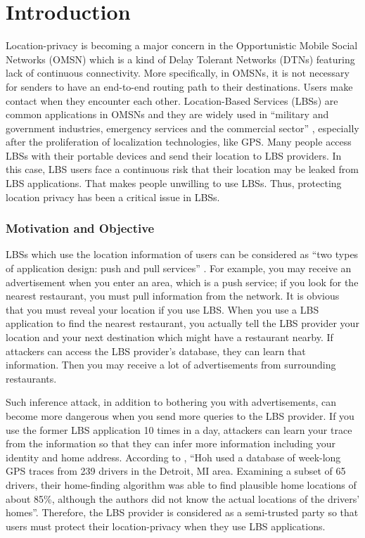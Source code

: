 \chapter {Introduction}
\label{INTRO}
\noindent Location-privacy is becoming a major concern in the Opportunistic Mobile Social Networks (OMSN) which is a kind of Delay Tolerant Networks (DTNs) \cite {C1} featuring lack of continuous connectivity. More specifically, in OMSNs, it is not necessary for senders to have an end-to-end routing path to their destinations. Users make contact when they encounter each other. Location-Based Services (LBSs) are common applications in OMSNs and they are widely used in ``military and government industries, emergency services and the commercial sector'' \cite {C4}, especially after the proliferation of localization technologies, like GPS. Many people access LBSs with their portable devices and send their location to LBS providers. In this case, LBS users face a continuous risk that their location may be leaked from LBS applications. That makes people unwilling to use LBSs. Thus, protecting location privacy has been a critical issue in LBSs.


\subsection{ Motivation and Objective}

\noindent LBSs which use the location information of users can be considered as ``two types of application design: push and pull services'' \cite {C4}. For example, you may receive an advertisement when you enter an area, which is a push service; if you look for the nearest restaurant, you must pull information from the network. It is obvious that you must reveal your location if you use LBS. When you use a LBS application to find the nearest restaurant, you actually tell the LBS provider your location and your next destination which might have a restaurant nearby. If attackers can access the LBS provider's database, they can learn that information. Then you may receive a lot of advertisements from surrounding restaurants.

Such inference attack, in addition to bothering you with advertisements, can become more dangerous when you send more queries to the LBS provider. If you use the former LBS application 10 times in a day, attackers can learn your trace from the information so that they can infer more information including your identity and home address. According to \cite {C5}, ``Hoh used a database of week-long GPS traces from 239 drivers in the Detroit, MI area. Examining a subset of 65 drivers, their home-finding algorithm was able to find plausible home locations of about 85\%, although the authors did not know the actual locations of the drivers' homes''. Therefore, the LBS provider is considered as a semi-trusted party so that users must protect their location-privacy when they use LBS applications.

